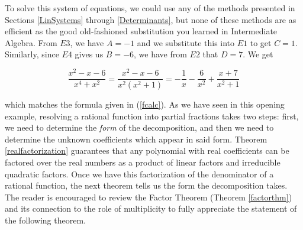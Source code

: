 To solve this system of equations, we could use any of the methods presented in Sections \ref{LinSystems} through \ref{Determinants}, but none of these methods are as efficient as the good old-fashioned substitution you learned in Intermediate Algebra.  From $E3$, we have $A=-1$ and we substitute this into $E1$ to get $C = 1$.  Similarly, since $E4$ gives us $B=-6$, we have from $E2$ that $D = 7$.  We get

\[ \dfrac{x^2-x-6}{x^4+x^2} =  \dfrac{x^2-x-6}{x^2 \left(x^2+1\right)} = -\dfrac{1}{x} - \dfrac{6}{x^2} + \dfrac{x+7}{x^2+1} \] 

which matches the formula given in (\ref{fcalc}).  As we have seen in this opening example, resolving a rational function into partial fractions takes two steps:  first, we need to determine the \textit{form} of the decomposition, and then we need to determine the unknown coefficients which appear in said form. Theorem \ref{realfactorization} guarantees that any polynomial with real coefficients can be factored over the real numbers as a product of linear factors and irreducible quadratic factors.  Once we have this factorization of the denominator of a rational function, the next theorem tells us the form the decomposition takes.  The reader is encouraged to review the Factor Theorem  (Theorem \ref{factorthm}) and its connection to the role of multiplicity to fully appreciate the statement of the following theorem.

\smallskip

